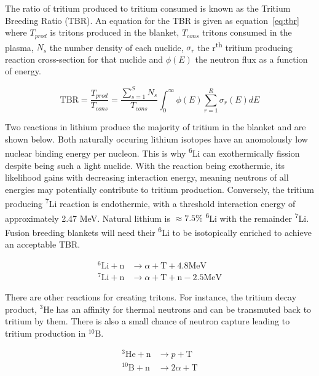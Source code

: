 The ratio of tritium produced to tritium consumed is known as the Tritium Breeding Ratio (TBR). An equation for the TBR is given as equation~\ref{eq:tbr} where $T_{prod}$ is tritons produced in the blanket, $T_{cons}$ tritons consumed in the plasma, $N_{s}$ the number density of each nuclide, $\sigma_{r}$ the r\textsuperscript{th} tritium producing reaction cross-section for that nuclide and $\phi(E)$ the neutron flux as a function of energy. 

\begin{equation}
  \label{eq:tbr}
  \mathrm{TBR} = \frac{T_{prod}}{T_{cons}} = \frac{\sum_{s=1}^{S} N_{s}}{T_{cons}} \int_{0}^{\infty} \phi(E) \sum_{r=1}^{R} \sigma_{r}(E) dE
\end{equation}

Two reactions in lithium produce the majority of tritium in the blanket and are shown below. Both naturally occuring lithium isotopes have an anomolously low nuclear binding energy per nucleon. This is why \textsuperscript{6}Li can exothermically fission despite being such a light nuclide. With the reaction being exothermic, its likelihood gains with decreasing interaction energy, meaning neutrons of all energies may potentially contribute to tritium production. Conversely, the tritium producing \textsuperscript{7}Li reaction is endothermic, with a threshold interaction energy of approximately 2.47 MeV. Natural lithium is $\approx 7.5\%$ \textsuperscript{6}Li with the remainder \textsuperscript{7}Li. Fusion breeding blankets will need their \textsuperscript{6}Li to be isotopically enriched to achieve an acceptable TBR.

\begin{equation}
\begin{split}
  ^{6}\mathrm{Li} + \mathrm{n} & \rightarrow \alpha + \mathrm{T} + 4.8\mathrm{MeV} \\
  ^{7}\mathrm{Li} + \mathrm{n} & \rightarrow \alpha + \mathrm{T} + \mathrm{n} - 2.5\mathrm{MeV}
\end{split}
\end{equation}

There are other reactions for creating tritons. For instance, the tritium decay product, $^{3}\mathrm{He}$ has an affinity for thermal neutrons and can be transmuted back to tritium by them. There is also a small chance of neutron capture leading to tritium production in $^{10}\mathrm{B}$.

\begin{equation}
\begin{split}
  ^{3}\mathrm{He} + \mathrm{n} & \rightarrow p + \mathrm{T} \\
  ^{10}\mathrm{B} + \mathrm{n} & \rightarrow 2\alpha + \mathrm{T}
\end{split}
\end{equation}

